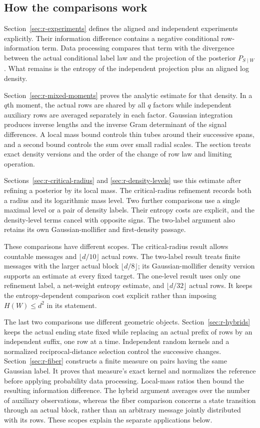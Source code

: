 \subsection*{How the comparisons work}

Section~\ref{sec:r-experiments} defines the aligned and independent
experiments explicitly.  Their information difference contains a
negative conditional row-information term.  Data processing
compares that term with the divergence between the actual
conditional label law and the projection of the posterior
\(P_{S\mid W}\).  What remains is the entropy of the independent
projection plus an aligned log density.

Section~\ref{sec:r-mixed-moments} proves the analytic estimate for
that density.  In a \(q\)th moment, the actual rows are shared by
all \(q\) factors while independent auxiliary rows are averaged
separately in each factor.  Gaussian integration produces inverse
lengths and the inverse Gram determinant of the signal differences.
A local mass bound controls thin tubes around their successive
spans, and a second bound controls the sum over small radial scales.
The section treats exact density versions and the order of the
change of row law and limiting operation.

Sections~\ref{sec:r-critical-radius} and
\ref{sec:r-density-levels} use this estimate after refining a
posterior by its local mass.  The critical-radius refinement records
both a radius and its logarithmic mass level.  Two further
comparisons use a single maximal level or a pair of density labels.
Their entropy costs are explicit, and the density-level terms
cancel with opposite signs.  The two-label argument also retains
its own Gaussian-mollifier and first-density passage.

These comparisons have different scopes.  The critical-radius result
allows countable messages and \(\lfloor d/10\rfloor\) actual rows.
The two-label result treats finite messages with the larger actual
block \(\lfloor d/8\rfloor\); its Gaussian-mollifier density version
supports an estimate at every fixed target.  The one-level result
uses only one refinement label, a net-weight entropy estimate, and
\(\lfloor d/32\rfloor\) actual rows.  It keeps the entropy-dependent
comparison cost explicit rather than imposing \(H(W)\le d^2\)
in its statement.

The last two comparisons use different geometric objects.
Section~\ref{sec:r-hybrids} keeps the actual ending state fixed
while replacing an actual prefix of rows by an independent suffix,
one row at a time.  Independent random kernels and a normalized
reciprocal-distance selection control the successive changes.
Section~\ref{sec:r-fiber} constructs a finite measure on pairs
having the same Gaussian label.  It proves that measure's exact
kernel and normalizes the reference before applying probability
data processing.  Local-mass ratios then bound the resulting
information difference.
The hybrid argument averages over the number of auxiliary observations,
whereas the fiber comparison concerns a state transition through an
actual block, rather than an arbitrary message jointly distributed
with its rows.  These scopes explain the separate applications below.

